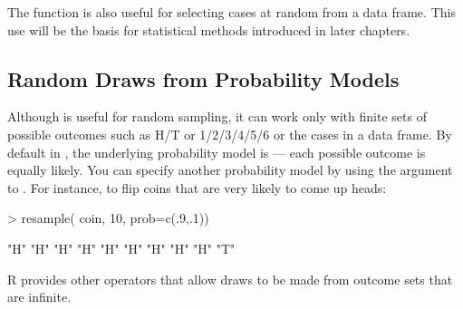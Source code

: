 The  function is also useful for selecting cases at
random from a data frame.  This use will be the basis for statistical
methods introduced in later chapters. 


\subsection{Random Draws from Probability Models}

Although  is useful for random sampling, it can work
only with finite sets of possible outcomes such as H/T or 1/2/3/4/5/6
or the cases in a data frame.  By default in , the 
underlying probability model is
 --- each possible outcome is equally likely.
You can specify another probability model by using the  argument
to . For instance, to flip coins that are very likely to come up heads:
\begin{Schunk}
\begin{Sinput}
> resample( coin, 10, prob=c(.9,.1))
\end{Sinput}
\begin{Soutput}
 [1] "H" "H" "H" "H" "H" "H" "H" "H" "H" "T"
\end{Soutput}
\end{Schunk}

R provides other operators that allow
draws to be made from outcome sets that are infinite.


